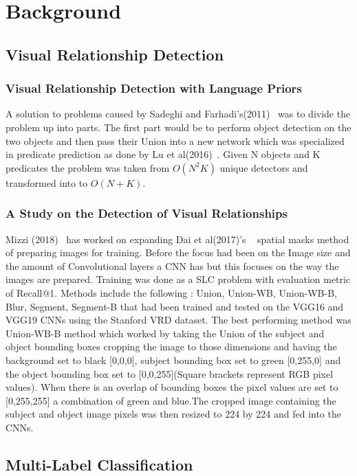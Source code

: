 \documentclass{IEEEtran}
\begin{document}
\section{Background}
\subsection{Visual Relationship Detection}
\subsubsection{Visual Relationship Detection with Language Priors}
A solution to problems caused by Sadeghi and Farhadi’s(2011)~\cite{VisualPhrases} was to divide the problem up into parts. The first part would be to perform object detection on the two objects and then pass their Union into a new network which was specialized in predicate prediction as done by Lu et al(2016)~\cite{lu2016visual}. Given N objects and K predicates the problem was taken from $O(N^2 K)$ unique detectors and transformed into to $O(N+K)$.
\subsubsection{A Study on the Detection of Visual Relationships}
Mizzi (2018)~\cite{detectionRelationships} has worked on expanding Dai et al(2017)'s ~\cite{Dai2017DetectingVR} spatial masks method of preparing images for training. Before the focus had been on the Image size and the amount of Convolutional layers a CNN has but this focuses on the way the images are prepared. Training was done as a SLC problem with evaluation metric of Recall@1. Methods include the following : Union, Union-WB, Union-WB-B, Blur, Segment, Segment-B that had been trained and tested on the VGG16 and VGG19 CNNs using the Stanford VRD dataset. The best performing method was Union-WB-B method which worked by taking the Union of the subject and object bounding boxes cropping the image to those dimensions and having the background set to black [0,0,0], subject bounding box set to green [0,255,0] and the object bounding box set to [0,0,255](Square brackets represent RGB pixel values). When there is an overlap of bounding boxes the pixel values are set to [0,255,255] a combination of green and blue.The cropped image containing the subject and object image pixels was then resized to 224 by 224 and fed into the CNNs.
\subsection{Multi-Label Classification}
\end{document}
